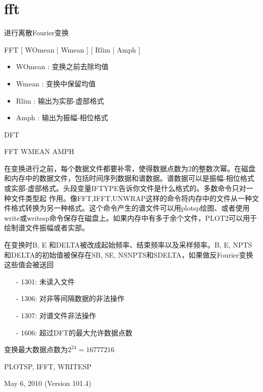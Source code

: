\section{fft}
\label{cmd:fft}

进行离散Fourier变换

FFT [ WOmean | Wmean ] [ Rlim | Amph ]

\begin{itemize}
\item WOmean :  变换之前去除均值 
\item Wmean : 变换中保留均值 
\item Rlim : 输出为实部-虚部格式
\item Amph : 输出为振幅-相位格式
\end{itemize}

DFT

FFT WMEAN AMPH

在变换进行之前，每个数据文件都要补零，使得数据点数为2的整数次幂。在磁盘和内存中的数据文件，包括时间序列数据和谱数据。谱数据可以是振幅-相位格式或实部-虚部格式。头段变量IFTYPE告诉你文件是什么格式的。多数命令只对一种文件类型起	作用。像FFT,IFFT,UNWRAP这样的命令将内存中的文件从一种文件格式转换为另一种格式。这个命令产生的谱文件可以用plotsp绘图、或者使用write或writesp命令保存在磁盘上。如果内存中有多于余个文件，PLOT2可以用于绘制谱文件振幅或者实部。

在变换时B, E 和DELTA被改成起始频率、结束频率以及采样频率。B, E, NPTS和DELTA的初始值被保存在SB, SE, NSNPTS和SDELTA，如果做反Fourier变换这些值会被送回

\begin{itemize}
\item[-]1301: 未读入文件
\item[-]1306: 对非等间隔数据的非法操作
\item[-]1307: 对谱文件非法操作
\item[-]1606: 超过DFT的最大允许数据点数
\end{itemize}

变换最大数据点数为$2^{24}=16777216$

PLOTSP, IFFT, WRITESP

May 6, 2010 (Version 101.4)
